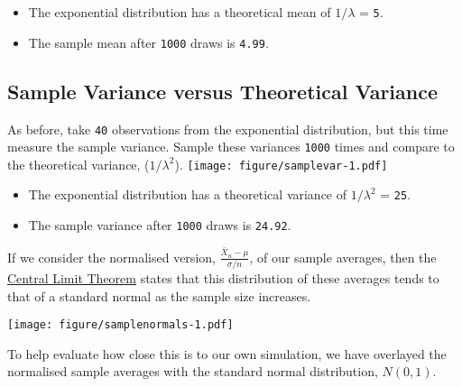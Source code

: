 \documentclass[legalpaper,11pt]{article}
\begin{document}
\begin{itemize}
\itemsep1pt\parskip0pt
\item
  The exponential distribution has a theoretical mean of \(1/\lambda\) =
  \texttt{5}.
\item
  The sample mean after \texttt{1000} draws is \texttt{4.99}.
\end{itemize}

\subsection{Sample Variance versus Theoretical
Variance}\label{sample-variance-versus-theoretical-variance}

As before, take \texttt{40} observations from the exponential
distribution, but this time measure the sample variance. Sample these
variances \texttt{1000} times and compare to the theoretical variance,
(\(1/\lambda^2\)). \texttt{[image: figure/samplevar-1.pdf]}

\begin{itemize}
\itemsep1pt\parskip0pt
\item
  The exponential distribution has a theoretical variance of
  \(1/\lambda^2\) = \texttt{25}.
\item
  The sample variance after \texttt{1000} draws is \texttt{24.92}.
\end{itemize}


If we consider the normalised version,
\(\frac {\bar X_n - \mu} {\sigma / n}\), of our sample averages, then
the \href{https://en.wikipedia.org/wiki/Central_limit_theorem}{Central
Limit Theorem} states that this distribution of these averages tends to
that of a standard normal as the sample size increases.

\texttt{[image: figure/samplenormals-1.pdf]}

To help evaluate how close this is to our own simulation, we have
overlayed the normalised sample averages with the standard normal
distribution, \(N(0,1)\).
\end{document}
